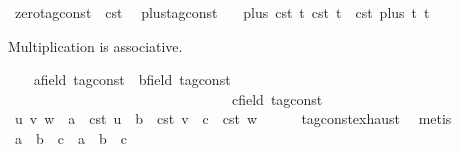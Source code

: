 \begin{isabellebody}
\isanewline
{}\isamarkupfalse%
\ {\isacartoucheopen}zero{\isacharunderscore}tag{\isacharunderscore}const\ {\isasymequiv}\ {\isasymtau}\isactrlsub c\isactrlsub s\isactrlsub t\ {}{\isacartoucheclose}\isanewline
\isanewline
{}\isamarkupfalse%
\ plus{\isacharunderscore}tag{\isacharunderscore}const\isanewline
\ \ \ {\isacartoucheopen}plus\ {\isacharparenleft}{\isasymtau}\isactrlsub c\isactrlsub s\isactrlsub t\ t\ {\isacharparenleft}{\isasymtau}\isactrlsub c\isactrlsub s\isactrlsub t\ t\ {\isacharequal}\ {\isasymtau}\isactrlsub c\isactrlsub s\isactrlsub t\ {\isacharparenleft}plus\ t\ t\isanewline
\isanewline
{}\isamarkupfalse%
%
\isadelimproof
\ %
\endisadelimproof
%
\isatagproof
{}\isamarkupfalse%
%
\begin{isamarkuptext}%
Multiplication is associative.%
\end{isamarkuptext}\isamarkuptrue%
\ \ \isamarkupfalse%
\ a{\isacharcolon}{\isacharcolon}{\isacartoucheopen}{\isacharprime}{\isasymtau}{\isacharcolon}{\isacharcolon}field\ tag{\isacharunderscore}const{\isacartoucheclose}\ \ b{\isacharcolon}{\isacharcolon}{\isacartoucheopen}{\isacharprime}{\isasymtau}{\isacharcolon}{\isacharcolon}field\ tag{\isacharunderscore}const{\isacartoucheclose}\isanewline
\ \ \ \ \ \ \ \ \ \ \ \ \ \ \ \ \ \ \ \ \ \ \ \ \ \ \ \ \ \ \ \ c{\isacharcolon}{\isacharcolon}{\isacartoucheopen}{\isacharprime}{\isasymtau}{\isacharcolon}{\isacharcolon}field\ tag{\isacharunderscore}const{\isacartoucheclose}\isanewline
\ \ \isamarkupfalse%
\ u\ v\ w\ \ {\isacartoucheopen}a\ {\isacharequal}\ {\isasymtau}\isactrlsub c\isactrlsub s\isactrlsub t\ u{\isacartoucheclose}\ \ {\isacartoucheopen}b\ {\isacharequal}\ {\isasymtau}\isactrlsub c\isactrlsub s\isactrlsub t\ v{\isacartoucheclose}\ \ {\isacartoucheopen}c\ {\isacharequal}\ {\isasymtau}\isactrlsub c\isactrlsub s\isactrlsub t\ w{\isacartoucheclose}\isanewline
\ \ \ \ \isamarkupfalse%
\ tag{\isacharunderscore}const{\isachardot}exhaust\ \isamarkupfalse%
\ metis\isanewline
\ \ \isamarkupfalse%
\ {\isacartoucheopen}a\ {\isacharasterisk}\ b\ {\isacharasterisk}\ c\ {\isacharequal}\ a\ {\isacharasterisk}\ {\isacharparenleft}b\ {\isacharasterisk}\ c{\isacharparenright}{\isacartoucheclose}\isanewline

\end{isabellebody}
